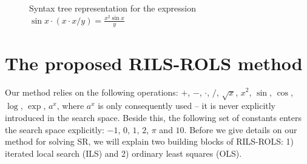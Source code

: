 \documentclass[a4paper,12pt]{elsarticle}
\begin{document}
	\begin{figure}[!ht]
		\centering
		
		\caption{Syntax tree representation for the expression $\sin{x} \cdot   ( x \cdot  x / y  )  = \frac{x^2 \sin x }{y}$}
		\label{fig:syntax-tree-example}
	\end{figure}
	
	
	
	\section{The proposed RILS-ROLS method}\label{sec:rils}
 
 	Our method relies on the following operations: $+$, $-$, $\cdot$, $/$, $\sqrt{x}$, $x^2 $, $\sin$, $\cos$, $\log$, $\exp$, $a^x$, where $a^x$ is only consequently used -- it is never explicitly introduced in the search space. Beside this, the following set of constants enters the search space explicitly: $-1$, $0$, $1$, $2$, $\pi$ and $10$. 
	Before we give details on our   method for solving SR, we will explain two building blocks of \textsc{RILS-ROLS}: 1) iterated local search (ILS) and 2) ordinary least squares (OLS). 
	
\end{document}
